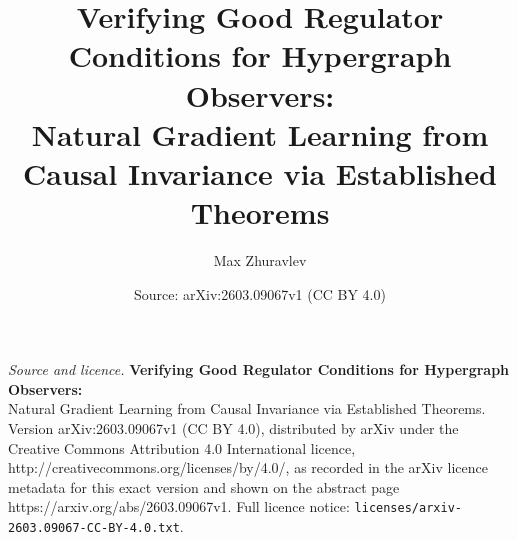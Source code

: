 \documentclass[10pt,a4paper]{amsart}
\title{\textbf{Verifying Good Regulator Conditions for Hypergraph Observers:} \\[0.3em] \large Natural Gradient Learning from Causal Invariance via Established Theorems}
\author{Max Zhuravlev}
\date{Source: arXiv:2603.09067v1 (CC BY 4.0)}
\begin{document}
\maketitle

\noindent\emph{Source and licence.} \textbf{Verifying Good Regulator Conditions for Hypergraph Observers:} \\[0.3em] \large Natural Gradient Learning from Causal Invariance via Established Theorems. Version arXiv:2603.09067v1 (CC BY 4.0), distributed by arXiv under the Creative Commons Attribution 4.0 International licence, http://creativecommons.org/licenses/by/4.0/, as recorded in the arXiv licence metadata for this exact version and shown on the abstract page https://arxiv.org/abs/2603.09067v1. Full licence notice: \texttt{licenses/arxiv-2603.09067-CC-BY-4.0.txt}.\par\smallskip
\end{document}
